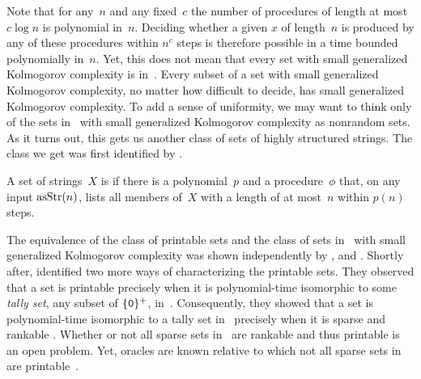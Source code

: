 Note that for any~$n$ and any fixed~$c$ the number of procedures of length at most $c\log n$ is polynomial in~$n$.
Deciding whether a given $x$ of length~$n$ is produced by any of these procedures within $n^c$ steps is therefore possible in a time bounded polynomially in~$n$.
Yet, this does not mean that every set with small generalized Kolmogorov complexity is in~.
Every subset of a set with small generalized Kolmogorov complexity, no matter how difficult to decide, has small generalized Kolmogorov complexity.
To add a sense of uniformity, we may want to think only of the sets in~ with small generalized Kolmogorov complexity as nonrandom sets.
As it turns out, this gets us another class of sets of highly structured strings.
The class we get was first identified by \textcite{hartmanis1984computation}.
\begin{definition}
  A set of strings~$X$ is  if there is a polynomial~$p$ and a procedure~$\phi$ that, on any input $\operatorname{asStr}(n)$, lists all members of~$X$ with a length of at most~$n$ within $p(n)$ steps.
\end{definition}

The equivalence of the class of \pdash{}printable sets and the class of sets in~ with small generalized Kolmogorov complexity was shown independently by \textcite{balcazar1986sets}, and \textcite{rubinstein1986note}.
Shortly after, \textcite{allender1988p-printable} identified two more ways of characterizing the \pdash{}printable sets.
They observed that a set is \pdash{}printable precisely when it is polynomial-time isomorphic to some \emph{tally set}, any subset of $\{\textnormal{\texttt{0}}\}^+$, in~.
Consequently, they showed that a set is polynomial-time isomorphic to a tally set in~ precisely when it is sparse and \pdash{}rankable \parencite[see also][]{goldsmith1996scalability}.
Whether or not all sparse sets in~ are \pdash{}rankable and thus \pdash{}printable is an open problem.
Yet, oracles are known relative to which not all sparse sets in~ are \pdash{}printable~\parencite{hartmanis1983generalized}.

